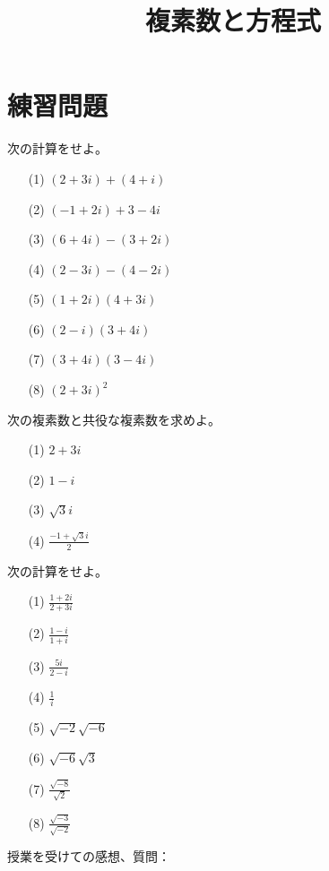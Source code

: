 \documentclass[12pt]{jarticle}
\title{複素数と方程式}
\begin{document}
\maketitle
\section*{練習問題}
次の計算をせよ。
\begin{itemize}
  \item[(1)]  $\displaystyle (2+3i)+(4+i)$
  \item[(2)] $\displaystyle (-1+2i) + 3-4i$
  \item[(3)] $\displaystyle (6+4i)- (3+2i)$
  \item[(4)] $\displaystyle (2-3i)-(4-2i)$
  \item[(5)] $\displaystyle (1+2i)(4+3i)$
  \item[(6)] $\displaystyle (2-i)(3+4i)$
  \item[(7)] $\displaystyle (3+4i)(3-4i)$
  \item[(8)] $\displaystyle (2+3i)^2$
\end{itemize}
次の複素数と共役な複素数を求めよ。
\begin{itemize}
  \item [(1)]$\displaystyle 2+3i$
  \item [(2)]$\displaystyle 1-i$
  \item [(3)]$\displaystyle \sqrt{3}i$
  \item [(4)]$\displaystyle \frac{-1+\sqrt{3}i}{2}$
\end{itemize}
次の計算をせよ。
\begin{itemize}
  \item [(1)]$\displaystyle \frac{1+2i}{2+3i}$
  \item [(2)]$\displaystyle \frac{1-i}{1+i}$
  \item [(3)]$\displaystyle \frac{5i}{2-i}$
  \item [(4)]$\displaystyle \frac{1}{i}$
  \item [(5)]$\displaystyle \sqrt{-2}\sqrt{-6}$
  \item [(6)]$\displaystyle \sqrt{-6}\sqrt{3}$
  \item [(7)]$\displaystyle \frac{\sqrt{-8}}{\sqrt{2}}$
  \item [(8)]$\displaystyle \frac{\sqrt{-3}}{\sqrt{-2}}$
\end{itemize}
授業を受けての感想、質問：
\end{document}
